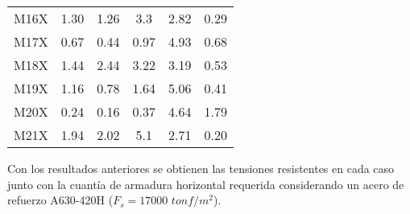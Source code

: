 \begin{table}[H]
\begin{tabular}{cccccc}
    M16X  & 1.30  & 1.26  & 3.3   & 2.82  & 0.29 \\
    M17X  & 0.67  & 0.44  & 0.97  & 4.93  & 0.68 \\
    M18X  & 1.44  & 2.44  & 3.22  & 3.19  & 0.53 \\
    M19X  & 1.16  & 0.78  & 1.64  & 5.06  & 0.41 \\
    M20X  & 0.24  & 0.16  & 0.37  & 4.64  & 1.79 \\
    M21X  & 1.94  & 2.02  & 5.1   & 2.71  & 0.20 \bigstrut[b]\\
    \hline
  \end{tabular}
  \label{esfsolicitante}
\end{table}

Con los resultados anteriores se obtienen las tensiones resistentes en cada caso junto con la cuantía de armadura horizontal requerida considerando un acero de refuerzo A630-420H ($F_s=17000$ $tonf/m^2$).


